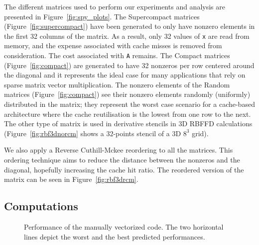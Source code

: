 \documentclass{sig-alternate}
\begin{document}
The different matrices used to perform our experiments and analysis
are presented in Figure~\ref{fig:spy_plots}. The
Supercompact matrices (Figure~\ref{fig:supercompact}) have been
generated to only have nonzero elements in the first 32 columns of
the matrix. As a result, only 32 values of {\tt x} are read
from memory, and the expense associated with cache misses is removed from consideration. The cost associated with 
{\tt A} remains. The Compact matrices
(Figure~\ref{fig:compact}) are generated to have 32 nonzeros per row
centered around the diagonal and it represents the ideal case for many
applications that rely on sparse matrix vector multiplication. The nonzero
elements of the Random
matrices (Figure~\ref{fig:compact}) see their nonzero elements
randomly (uniformly) distributed in the matrix; they represent the
worst case scenario for a cache-based architecture where the cache
reutilisation is the lowest from one row to the next.
The other type of matrix is used in derivative stencils in 3D
RBFFD calculations (Figure~\ref{fig:rbf3dnorcm} shows a $32$-points
stencil of a 3D $8^3$ grid).

We also apply a Reverse Cuthill-Mckee reordering to
all the matrices.  This ordering technique aims to reduce the
distance between the nonzeros and the diagonal, hopefully increasing 
the cache hit ratio.  The reordered version of the matrix can be
seen in Figure~\ref{fig:rbf3drcm}.

\vspace{-0.3em}
\subsection{Computations}

\begin{figure}[t]
  \centering
  
  \caption{Performance of the manually vectorized code. The two
    horizontal lines depict the worst and the best predicted performances.}
  \label{fig:expe_types}
\end{figure}
\end{document}
